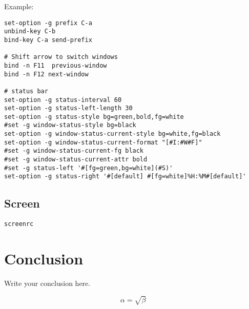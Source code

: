 \documentclass[12pt,a4paper]{article}
\begin{document}
Example:

\begin{verbatim}
set-option -g prefix C-a
unbind-key C-b
bind-key C-a send-prefix

# Shift arrow to switch windows
bind -n F11  previous-window
bind -n F12 next-window

# status bar
set-option -g status-interval 60
set-option -g status-left-length 30
set-option -g status-style bg=green,bold,fg=white
#set -g window-status-style bg=black
set-option -g window-status-current-style bg=white,fg=black
set-option -g window-status-current-format "[#I:#W#F]"
#set -g window-status-current-fg black
#set -g window-status-current-attr bold
#set -g status-left '#[fg=green,bg=white](#S)'
set-option -g status-right '#[default] #[fg=white]%H:%M#[default]'
\end{verbatim}

\subsection{Screen}

\begin{verbatim}
screenrc
\end{verbatim}

\section{Conclusion}

Write your conclusion here.

\begin{equation}
    \label{simple_equation}
    \alpha = \sqrt{\beta}
\end{equation}
\end{document}
